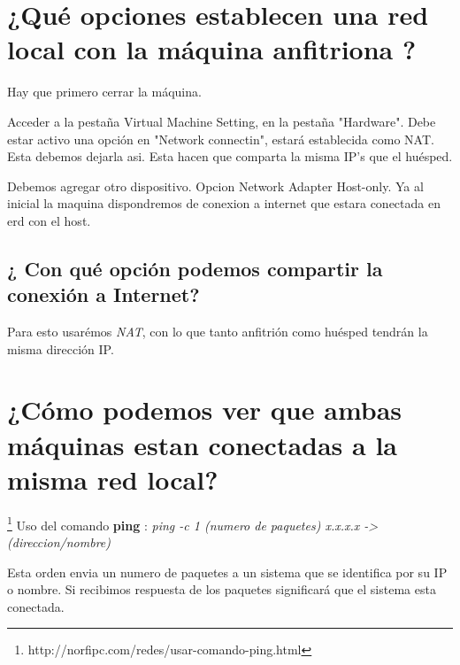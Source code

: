 \section{¿Qué opciones establecen una red local con la máquina anfitriona ?}
Hay que primero cerrar la máquina.

Acceder a la pestaña Virtual Machine Setting, en la pestaña "Hardware".
Debe estar activo una opción en "Network connectin", estará establecida como NAT. Esta debemos dejarla asi. Esta hacen que comparta la misma IP's que el huésped.
	
Debemos agregar otro dispositivo. Opcion Network Adapter Host-only.
	Ya al inicial la maquina dispondremos de conexion a internet que estara conectada en erd con el host.
\subsection{¿ Con qué opción podemos compartir la conexión a Internet?}
Para esto usarémos \textit{NAT}, con lo que tanto anfitrión como huésped tendrán la misma dirección IP.
\section{¿Cómo podemos ver que ambas máquinas estan conectadas a la misma red local?}
\footnote{http://norfipc.com/redes/usar-comando-ping.html}
Uso del comando \textbf{ping} : \textit{ping -c 1 (numero de paquetes) x.x.x.x -> (direccion/nombre)}

Esta orden envia un numero de paquetes a un sistema que se identifica por su IP o nombre. Si recibimos respuesta de los paquetes significará que el sistema esta conectada.



